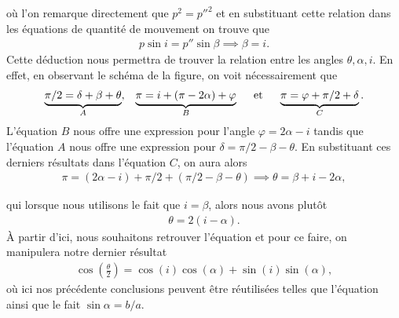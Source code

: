 où l'on remarque directement que $p^2 = p''^2$ et en substituant cette relation dans les équations de quantité de mouvement on trouve que
\begin{align*}
    p\sin i = p''\sin\beta\implies\beta = i.
\end{align*}
Cette déduction nous permettra de trouver la relation entre les
angles $\theta, \alpha, i$. En effet, en observant le schéma de
la figure, on voit nécessairement que
\begin{align*}
    \underbrace{\pi/2 = \delta + \beta + \theta}_A,\;\;\; \underbrace{\pi = i + (\pi - 2\alpha) + \varphi}_B\hspace{0.5cm}\text{et}\hspace{0.5cm} \underbrace{\pi = \varphi + \pi/2 + \delta}_C.
\end{align*}
L'équation $B$ nous offre une expression pour l'angle $\varphi = 2\alpha - i$ tandis que l'équation $A$ nous offre une expression pour $\delta = \pi/2 - \beta - \theta$. En substituant ces derniers résultats dans l'équation $C$, on aura alors
\begin{align*}
    \pi = (2\alpha - i) + \pi/2 + (\pi/2 - \beta - \theta)\implies\theta = \beta + i - 2\alpha,
\end{align*}

qui lorsque nous utilisons le fait que $i = \beta$, alors nous avons
plutôt
\begin{align*}
    \theta = 2(i - \alpha).
\end{align*}
À partir d'ici, nous souhaitons retrouver l'équation et pour ce
faire, on manipulera notre dernier résultat
\begin{align}
    \boxed{
        \cos\left(\frac{\theta}{2}\right) = \cos(i)\cos(\alpha) +
        \sin(i)\sin(\alpha),
    }
    \label{eq: test_eq}
\end{align}
où ici nos précédente conclusions peuvent être réutilisées telles
que l'équation ainsi que le fait
$\sin\alpha = b/a$. \\

\blindtext[2]

\clearpage

